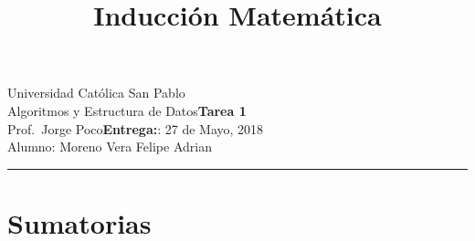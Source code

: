 \documentclass{article}
\title{Inducción Matemática}
\date{}
\newcommand{\assignment}{Tarea 1}
\newcommand{\duedate}{27 de Mayo, 2018}
\begin{document}
Universidad Católica San Pablo\hfill\\
Algoritmos y Estructura de Datos\hfill\textbf{\assignment}\\
Prof.\ Jorge Poco\hfill\textbf{Entrega:}: \duedate\\
Alumno: Moreno Vera Felipe Adrian
\smallskip\hrule\bigskip

{\let\newpage\relax\maketitle}
\maketitle


\section{Sumatorias}
\end{document}
